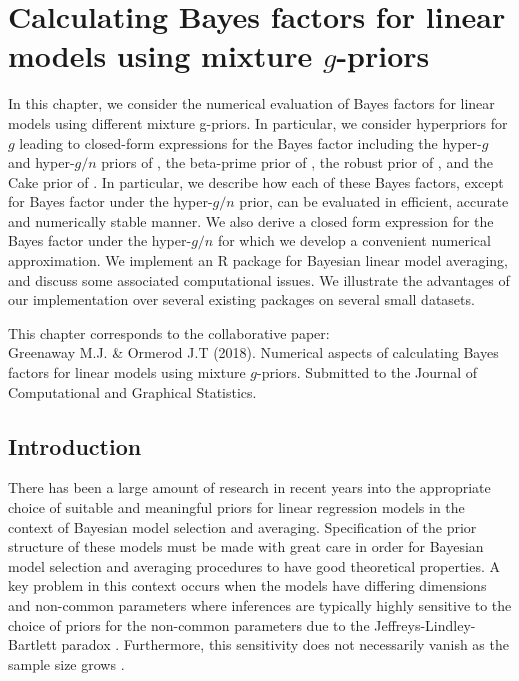 
\chapter{Calculating Bayes factors for linear models using
	mixture $g$-priors
	}



\noindent
In this chapter, we consider the numerical evaluation of Bayes factors for
linear models using different mixture g-priors. In particular, we consider
hyperpriors for $g$ leading to closed-form expressions for the Bayes factor
including the hyper-$g$ and hyper-$g/n$ priors of \cite{Liang2008}, the
beta-prime prior of \cite{Maruyama2011}, the robust prior of
\cite{Bayarri2012}, and the Cake prior of \cite{OrmerodEtal2017}. In
particular, we describe how each of these Bayes factors, except for Bayes
factor under the hyper-$g/n$ prior, can be evaluated in efficient, accurate and
numerically stable manner. We also derive a closed form expression for the
Bayes factor under the hyper-$g/n$ for which we develop a convenient numerical
approximation. We implement an R package for Bayesian linear model averaging,
and discuss some associated computational issues. We illustrate the advantages
of our implementation over several existing packages on several small datasets.


\vfill
{\footnotesize
\noindent	
	This chapter corresponds to the collaborative paper: \\
	Greenaway M.J. \& Ormerod J.T (2018).
	Numerical aspects of calculating Bayes factors for linear models using mixture $g$-priors. Submitted to the Journal of Computational and Graphical Statistics.
}

\newpage 

 
\section{Introduction}

 
There has been a large amount of research in recent years into the appropriate
choice of suitable and meaningful priors for linear regression models in the
context of Bayesian model selection and averaging. Specification of the prior
structure of these models must be made with great care in order for Bayesian
model selection and averaging procedures to have good theoretical properties.
A key problem in this context occurs when the models have differing dimensions
and non-common parameters where inferences are typically highly sensitive to
the choice of priors for the non-common parameters due to the
Jeffreys-Lindley-Bartlett paradox
\citep{Lindley1957,Bartlett1957,OrmerodEtal2017}.  Furthermore, this
sensitivity does not necessarily vanish as the sample size grows
\citep{Kass1995,Berger2001}.  

